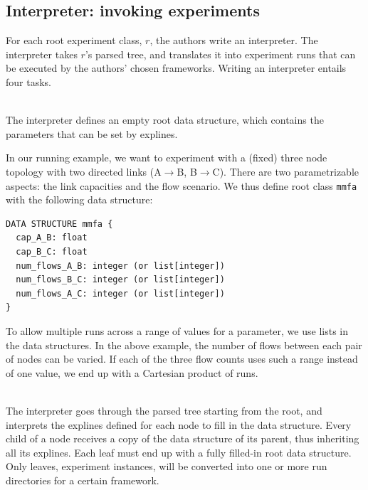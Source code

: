 
\subsection{Interpreter: invoking experiments}
\label{sec:interpreter}

For each root experiment class, $r$, the authors write an interpreter. The interpreter takes $r$'s parsed tree, and translates it into experiment runs that can be executed by the authors' chosen frameworks. Writing an interpreter entails four tasks.

\\
The interpreter defines an empty root data structure, which contains the parameters that can be set by explines.

In our running example, we want to experiment with a (fixed) three node topology with two directed links (A$\rightarrow$B, B$\rightarrow$C). There are two parametrizable aspects: the link capacities and the flow scenario. We thus define root class \texttt{mmfa} with the following data structure:
\vspace{-0in}
\begin{verbatim}
DATA STRUCTURE mmfa {
  cap_A_B: float
  cap_B_C: float
  num_flows_A_B: integer (or list[integer])
  num_flows_B_C: integer (or list[integer])
  num_flows_A_C: integer (or list[integer])
}
\end{verbatim}
\vspace{-0in}
\noindent To allow multiple runs across a range of values for a parameter, we use lists in the data structures. In the above example, the number of flows between each pair of nodes can be varied. If each of the three flow counts uses such a range instead of one value, we end up with a Cartesian product of runs.

\\
The interpreter goes through the parsed tree starting from the root, and interprets the explines defined for each node to fill in the data structure. Every child of a node receives a copy of the data structure of its parent, thus inheriting all its explines. Each leaf must end up with a fully filled-in root data structure. Only leaves, \ie experiment instances, will be converted into one or more run directories for a certain framework.

